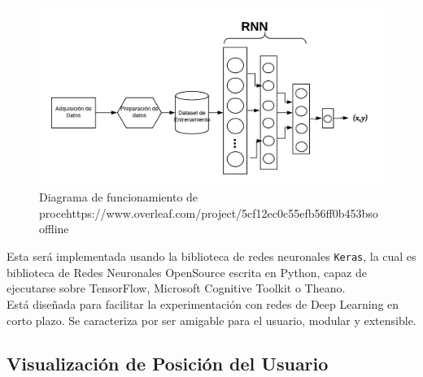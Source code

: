 \begin{figure}[h!]
    \centering
    \includegraphics[scale=0.4]{./images/Red_offline}
    \caption{Diagrama de funcionamiento de procehttps://www.overleaf.com/project/5cf12ec0c55efb56ff0b453bso offline}
    \label{fig:Red_offline}
\end{figure}

Esta será implementada usando la biblioteca de redes neuronales \texttt{Keras}, la cual es biblioteca de Redes Neuronales OpenSource escrita en Python, capaz de ejecutarse sobre TensorFlow, Microsoft Cognitive Toolkit o Theano.\\

Está diseñada para facilitar la experimentación con redes de Deep Learning en corto plazo. Se caracteriza por ser amigable para el usuario, modular y extensible.

\newpage
\subsection{Visualización de Posición del Usuario}

